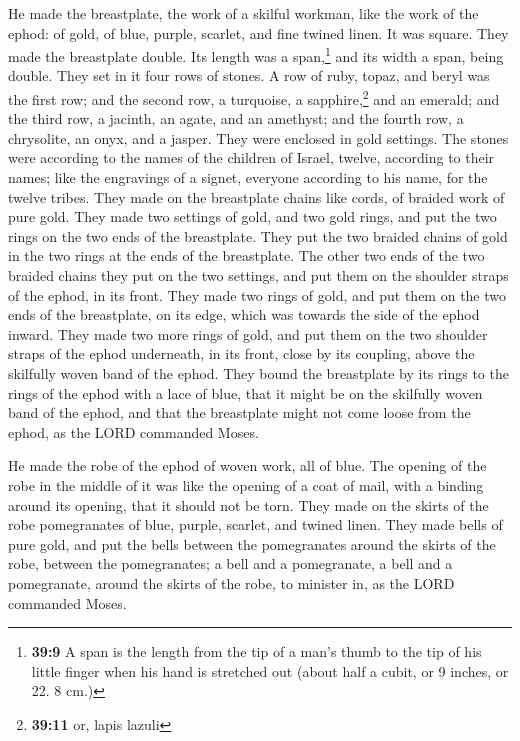  He made the breastplate, the work of a skilful workman,
like the work of the ephod: of gold, of blue, purple, scarlet, and fine
twined linen.  It was square. They made the breastplate
double. Its length was a span,\footnote{\textbf{39:9} A span is the
  length from the tip of a man's thumb to the tip of his little finger
  when his hand is stretched out (about half a cubit, or 9 inches, or
  22. 8 cm.)} and its width a span, being double.  They
set in it four rows of stones. A row of ruby, topaz, and beryl was the
first row;  and the second row, a turquoise, a
sapphire,\footnote{\textbf{39:11} or, lapis lazuli} and an emerald;
 and the third row, a jacinth, an agate, and an amethyst;
 and the fourth row, a chrysolite, an onyx, and a jasper.
They were enclosed in gold settings.  The stones were
according to the names of the children of Israel, twelve, according to
their names; like the engravings of a signet, everyone according to his
name, for the twelve tribes.  They made on the
breastplate chains like cords, of braided work of pure gold.
 They made two settings of gold, and two gold rings, and
put the two rings on the two ends of the breastplate. 
They put the two braided chains of gold in the two rings at the ends of
the breastplate.  The other two ends of the two braided
chains they put on the two settings, and put them on the shoulder straps
of the ephod, in its front.  They made two rings of gold,
and put them on the two ends of the breastplate, on its edge, which was
towards the side of the ephod inward.  They made two more
rings of gold, and put them on the two shoulder straps of the ephod
underneath, in its front, close by its coupling, above the skilfully
woven band of the ephod.  They bound the breastplate by
its rings to the rings of the ephod with a lace of blue, that it might
be on the skilfully woven band of the ephod, and that the breastplate
might not come loose from the ephod, as the LORD commanded Moses.

 He made the robe of the ephod of woven work, all of
blue.  The opening of the robe in the middle of it was
like the opening of a coat of mail, with a binding around its opening,
that it should not be torn.  They made on the skirts of
the robe pomegranates of blue, purple, scarlet, and twined linen.
 They made bells of pure gold, and put the bells between
the pomegranates around the skirts of the robe, between the
pomegranates;  a bell and a pomegranate, a bell and a
pomegranate, around the skirts of the robe, to minister in, as the LORD
commanded Moses.


